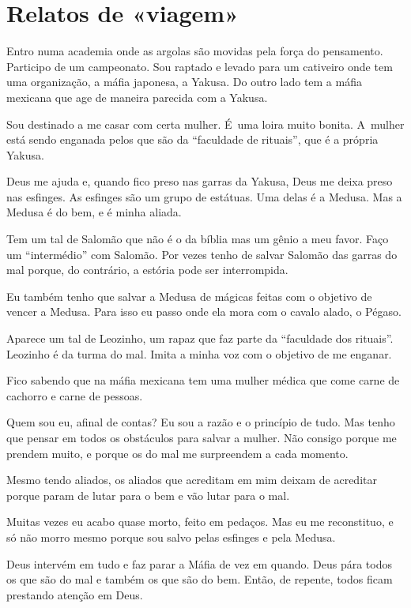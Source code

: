  

\section{Relatos de «viagem»}

Entro numa academia onde as argolas são movidas pela força do
pensamento. Participo de um campeonato. Sou raptado e levado para um
cativeiro onde tem uma organização, a máfia japonesa, a Yakusa. Do outro
lado tem a máfia mexicana que age de maneira parecida com a Yakusa.

Sou destinado a me casar com certa mulher. É~uma loira muito bonita. A~mulher está sendo enganada pelos que são da ``faculdade de rituais'',
que é a própria Yakusa.

Deus me ajuda e, quando fico preso nas garras da Yakusa, Deus me deixa
preso nas esfinges. As esfinges são um grupo de estátuas. Uma delas é a
Medusa. Mas a Medusa é do bem, e é minha aliada.

Tem um tal de Salomão que não é o da bíblia mas um gênio a meu favor.
Faço um ``intermédio'' com Salomão. Por vezes tenho de salvar Salomão
das garras do mal porque, do contrário, a estória pode ser interrompida.

Eu também tenho que salvar a Medusa de mágicas feitas com o objetivo de
vencer a Medusa. Para isso eu passo onde ela mora com o cavalo alado, o
Pégaso.

Aparece um tal de Leozinho, um rapaz que faz parte da ``faculdade dos
rituais''. Leozinho é da turma do mal. Imita a minha voz com o objetivo
de me enganar.

Fico sabendo que na máfia mexicana tem uma mulher médica que come carne
de cachorro e carne de pessoas.

Quem sou eu, afinal de contas? Eu sou a razão e o princípio de tudo. Mas
tenho que pensar em todos os obstáculos para salvar a mulher. Não
consigo porque me prendem muito, e porque os do mal me surpreendem a
cada momento.

Mesmo tendo aliados, os aliados que acreditam em mim deixam de acreditar
porque param de lutar para o bem e vão lutar para o mal.

Muitas vezes eu acabo quase morto, feito em pedaços. Mas eu me
reconstituo, e só não morro mesmo porque sou salvo pelas esfinges e pela
Medusa.

Deus intervém em tudo e faz parar a Máfia de vez em quando. Deus pára
todos os que são do mal e também os que são do bem. Então, de repente,
todos ficam prestando atenção em Deus.

